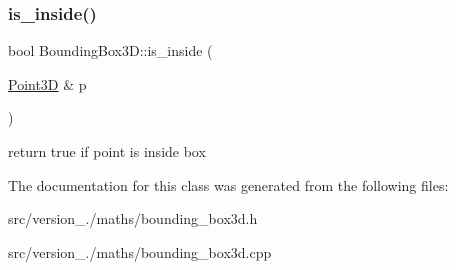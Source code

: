 \subsubsection{\texorpdfstring{is\+\_\+inside()}{is\_inside()}}
{\footnotesize\ttfamily bool Bounding\+Box3\+D\+::is\+\_\+inside (\begin{DoxyParamCaption}\item[{\hyperlink{classez_1_1maths_1_1Point3D}{Point3D} \&}]{p }\end{DoxyParamCaption})}

return true if point is inside box 

The documentation for this class was generated from the following files\+:\begin{DoxyCompactItemize}
\item 
src/version\+\_./maths/bounding\+\_\+box3d.\+h\item 
src/version\+\_./maths/bounding\+\_\+box3d.\+cpp\end{DoxyCompactItemize}
